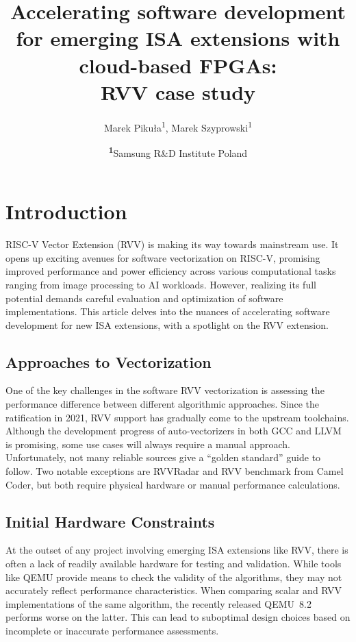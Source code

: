 \documentclass[
	a4paper, %
	10pt, %
	unnumberedsections, %
	twoside, %
]{LTJournalArticle}
\title{Accelerating software development for emerging ISA extensions with cloud-based FPGAs: \\ RVV case study}
\author{%
	Marek Pikuła\textsuperscript{1}, Marek Szyprowski\textsuperscript{1}
}
\date{\footnotesize\textsuperscript{\textbf{1}}Samsung R\&D Institute Poland}
\begin{document}
\maketitle %


\section{Introduction}

RISC-V Vector Extension (RVV) is making its way towards mainstream use. It opens
up exciting avenues for software vectorization on RISC-V, promising improved
performance and power efficiency across various computational tasks ranging from
image processing to AI workloads. However, realizing its full potential demands
careful evaluation and optimization of software implementations. This article
delves into the nuances of accelerating software development for new ISA
extensions, with a spotlight on the RVV extension.

\subsection{Approaches to Vectorization}

One of the key challenges in the software RVV vectorization is assessing the
performance difference between different algorithmic approaches. Since the
ratification in 2021, RVV support has gradually come to the upstream toolchains.
Although the development progress of auto-vectorizers in both GCC and LLVM is
promising, some use cases will always require a manual approach. Unfortunately,
not many reliable sources give a “golden standard” guide to follow. Two notable
exceptions are RVVRadar\autocite{KSG:2022} and RVV benchmark from Camel
Coder\autocite{CC:2024}, but both require physical hardware or manual
performance calculations.

\subsection{Initial Hardware Constraints}

At the outset of any project involving emerging ISA extensions like RVV, there
is often a lack of readily available hardware for testing and validation. While
tools like QEMU provide means to check the validity of the algorithms, they may
not accurately reflect performance characteristics. When comparing scalar and
RVV implementations of the same algorithm, the recently released QEMU~8.2
performs worse on the latter. This can lead to suboptimal design choices based
on incomplete or inaccurate performance assessments.
\end{document}
